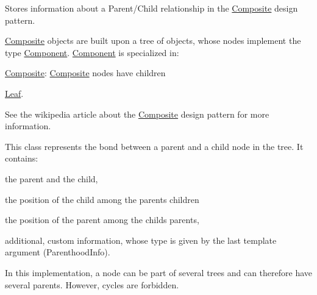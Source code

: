 Stores information about a Parent/\+Child relationship in the \hyperlink{classocra_1_1Composite}{Composite} design pattern. 

\hyperlink{classocra_1_1Composite}{Composite} objects are built upon a tree of objects, whose nodes implement the type \hyperlink{classocra_1_1Component}{Component}. \hyperlink{classocra_1_1Component}{Component} is specialized in\+:
\begin{DoxyItemize}
\item \hyperlink{classocra_1_1Composite}{Composite}\+: \hyperlink{classocra_1_1Composite}{Composite} nodes have children
\item \hyperlink{classocra_1_1Leaf}{Leaf}.
\end{DoxyItemize}

See the wikipedia article about the \hyperlink{classocra_1_1Composite}{Composite} design pattern for more information.

This class represents the bond between a parent and a child node in the tree. It contains\+:
\begin{DoxyItemize}
\item the parent and the child,
\item the position of the child among the parent\textquotesingle{}s children
\item the position of the parent among the child\textquotesingle{}s parents,
\item additional, custom information, whose type is given by the last template argument (Parenthood\+Info).
\end{DoxyItemize}

In this implementation, a node can be part of several trees and can therefore have several parents. However, cycles are forbidden.


